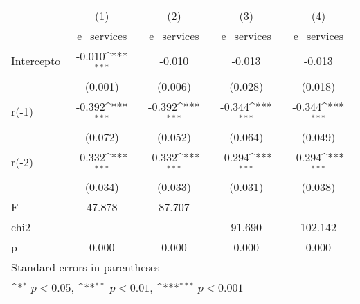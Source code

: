{
\def\sym#1{\ifmmode^{#1}\else\(^{#1}\)\fi}
\begin{longtable}{l*{4}{c}}
\hline\hline\endfirsthead\hline\endhead\hline\endfoot\endlastfoot
            &\multicolumn{1}{c}{(1)}&\multicolumn{1}{c}{(2)}&\multicolumn{1}{c}{(3)}&\multicolumn{1}{c}{(4)}\\
            &\multicolumn{1}{c}{e\_services}&\multicolumn{1}{c}{e\_services}&\multicolumn{1}{c}{e\_services}&\multicolumn{1}{c}{e\_services}\\
\hline
Intercepto  &      -0.010\sym{***}&      -0.010         &      -0.013         &      -0.013         \\
            &     (0.001)         &     (0.006)         &     (0.028)         &     (0.018)         \\
r(-1)       &      -0.392\sym{***}&      -0.392\sym{***}&      -0.344\sym{***}&      -0.344\sym{***}\\
            &     (0.072)         &     (0.052)         &     (0.064)         &     (0.049)         \\
r(-2)       &      -0.332\sym{***}&      -0.332\sym{***}&      -0.294\sym{***}&      -0.294\sym{***}\\
            &     (0.034)         &     (0.033)         &     (0.031)         &     (0.038)         \\
\hline
F           &      47.878         &      87.707         &                     &                     \\
chi2        &                     &                     &      91.690         &     102.142         \\
p           &       0.000         &       0.000         &       0.000         &       0.000         \\
\hline\hline
\multicolumn{5}{l}{\footnotesize Standard errors in parentheses}\\
\multicolumn{5}{l}{\footnotesize \sym{*} \(p<0.05\), \sym{**} \(p<0.01\), \sym{***} \(p<0.001\)}\\
\end{longtable}
}
